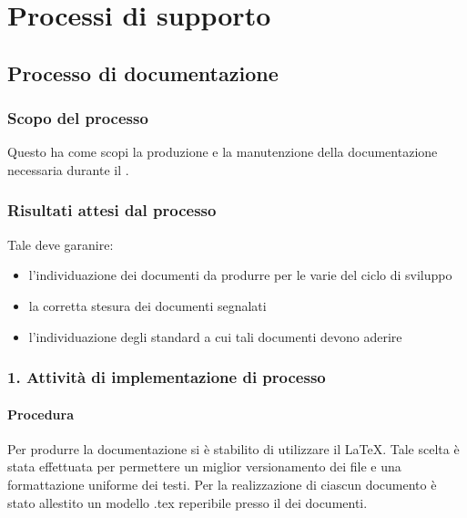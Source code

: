 \section{Processi di supporto}
\subsection{Processo di documentazione}

\subsubsection{Scopo del processo}
Questo  ha come scopi la produzione e la manutenzione della documentazione necessaria durante il .
\subsubsection{Risultati attesi dal processo}
Tale  deve garanire:
\begin{itemize}
\item l'individuazione dei documenti da produrre per le varie  del ciclo di sviluppo
\item la corretta stesura dei documenti segnalati
\item l'individuazione degli standard a cui tali documenti devono aderire
\end{itemize}


\subsubsection{1. Attivit\`a di implementazione di processo}    %
  \paragraph*{Procedura}
  Per produrre la documentazione si è stabilito di utilizzare il  \LaTeX. Tale scelta è stata effettuata per permettere un miglior versionamento dei file e una formattazione uniforme dei testi.
  Per la realizzazione di ciascun documento \`e stato allestito un modello .tex reperibile presso il  dei documenti.

